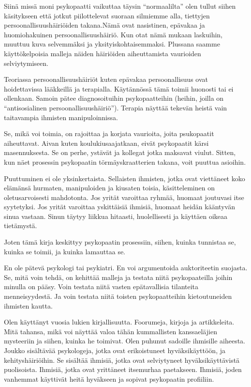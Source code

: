 Siinä missä moni psykopaatti vaikuttaa täysin ``normaalilta\vmq{,}'' olen tullut siihen käsitykseen että jotkut piilottelevat suoraan silmiemme alla, tiettyjen persoonallisuushäiriöiden takana.Nämä ovat nasistinen, epävakaa ja huomiohakuinen persoonallisuushäiriö. Kun otat nämä mukaan laskuihin, muuttuu kuva selvemmäksi ja yksityiskohtaisemmaksi. Plussana saamme käyttökelpoisia malleja näiden häiriöiden aiheuttamista vaurioiden selviytymiseen.

Teoriassa persoonallisuushäiriöt kuten epävakaa persoonallisuus ovat hoidettavissa lääkkeillä ja terapialla. Käytännössä tämä toimii huonosti tai ei ollenkaan. Samoin pätee diagnosoituihin psykopaatteihin (heihin, joilla on ``antisosialinen persoonallisuushäiriö''). Terapia näyttää tekevän heistä vain taitavampia ihmisten manipuloinnissa.

Se, mikä voi toimia, on rajoittaa ja korjata vaurioita, joita psukopaatit aiheuttavat. Aivan kuten koulukiusaajatkaan, eivät psykopaatit kärsi masennuksesta. Se on perhe, ystävät ja kollegat jotka maksavat viulut. Sitten, kun näet prosessin psykopaatin törmäyskraatterien takana, voit puuttua asioihin.

Puuttuminen ei ole yksinkertaista. Sellaisten ihmisten, jotka ovat viettäneet koko elämänsä hurmaten, manipuloiden ja kiusaten toisia, käsitteleminen on oletusarvoisesti mahdotonta. Jos yrität varoittaa ryhmää, huomaat joutuvasi itse syytetyksi. Jos yrität varoittaa yskittäisiä ihmisiä, huomaat heidän kääntyvän sinua vastaan. Sinun täytyy liikkua hitaasti, huolellisesti ja käyttäen oikeaa tietämystä.

Joten tämä kirja keskittyy psykopaatin prosessiin, siihen, kuinka tunnistaa se, kuinka se toimii, ja kuinka lamauttaa se.

En ole pätevä psykologi tai psykiatri. En voi argumentoida auktoriteetin suojasta. Se, mitä voin tehdä, on kehittää malleja ja testata niitä psykopaateilla joihin minulla on pääsy. Voin testata niitä vasten epätavallisia tilanteita menneisyydestä. Ja voin testata niitä toisten psykopaatteihin kietoutuneiden ihmisten kautta.

Olen käyttänyt vuosia lukien kirjallisuutta. Foorumeja, kirjoja ja artikkeleita. Mitä tahansa, mikä voi näyttää valoa tähän kummallisten kanssaeläjien mysteeriin ja siihen, kuinka he toimivat. Olen puhunut sadoille ihmisille aiheesta. Joukko sisältävää psykologeja, jotka ovat erikoistuneet hyväksikäyttöön, ja kehityshäiriöihin. Se sisältää ihmisiä, jotka ovat selviytyneet hyväksikäyttävistä puolisoista. Ihmisiä, jotka ovat yrittäneet itsemurhaa paetakseen. Ihmisiä, joden vanhemmat käyttivät heitä hyväkseen ja sopivat psykopaatin profiiliin.

